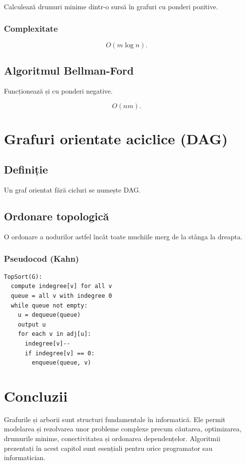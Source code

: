 \documentclass[12pt]{article}
\begin{document}
Calculează drumuri minime dintr-o sursă în grafuri cu ponderi pozitive.

\subsubsection*{Complexitate}



\[
O(m \log n).
\]



\subsection{Algoritmul Bellman-Ford}

Funcționează și cu ponderi negative.



\[
O(nm).
\]



\section{Grafuri orientate aciclice (DAG)}

\subsection{Definiție}

Un graf orientat fără cicluri se numește DAG.

\subsection{Ordonare topologică}

O ordonare a nodurilor astfel încât toate muchiile merg de la stânga la dreapta.

\subsubsection*{Pseudocod (Kahn)}

\begin{verbatim}
TopSort(G):
  compute indegree[v] for all v
  queue = all v with indegree 0
  while queue not empty:
    u = dequeue(queue)
    output u
    for each v in adj[u]:
      indegree[v]--
      if indegree[v] == 0:
        enqueue(queue, v)
\end{verbatim}

\section{Concluzii}

Grafurile și arborii sunt structuri fundamentale în informatică. Ele permit
modelarea și rezolvarea unor probleme complexe precum căutarea, optimizarea,
drumurile minime, conectivitatea și ordonarea dependențelor. Algoritmii
prezentați în acest capitol sunt esențiali pentru orice programator sau
informatician.
\end{document}
